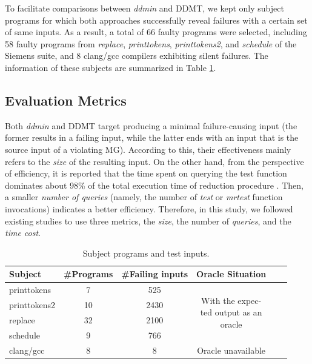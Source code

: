 To facilitate comparisons between \emph{ddmin} and DDMT, we kept only subject programs for which both approaches successfully reveal failures with a certain set of same inputs.
As a result, a total of 66 faulty programs were selected, including 58 faulty programs from \emph{replace}, \emph{printtokens}, \emph{printtokens2}, 
and \emph{schedule} of the Siemens suite, and 8 clang/gcc compilers exhibiting silent failures.
The information of these subjects are summarized in Table \ref{tab:subjects}.


\subsection{Evaluation Metrics}
Both \emph{ddmin} and DDMT target producing a minimal failure-causing input (the former results in a failing input, while the latter ends with an input that is the source input of a violating MG).
According to this, their effectiveness mainly refers to  the \emph{size} of the resulting input.
On the other hand, from the perspective of efficiency, it is reported that the time spent on querying the test function dominates about 98\% of the total execution time of reduction procedure \cite{Herfert2017}.
Then, a smaller \emph{number of queries} (namely, the number of \emph{test} or \emph{mrtest} function invocations) indicates a better efficiency.
Therefore, in this study, we followed existing studies \cite{Zeller2002, wang2021, Misherghi2016, Sun2018} to use three metrics, the \emph{size}, the number of \emph{queries}, and the \emph{time cost}.

\begin{table}[!t]
\caption{Subject programs and test inputs.}
\centering
\begin{tabular}{lccccc}
\toprule
\textbf{Subject} & \textbf{\#Programs} & \textbf{\#Failing inputs} & \multicolumn{1}{c}{\textbf{Oracle Situation}} \\
\midrule
printtokens       & 7  & 525  & \multirow{4}{*}{\parbox[t]{2cm}{With the expec-\\ted output as an \\ oracle}} \\
printtokens2      & 10 & 2430  &                       \\
replace           & 32 & 2100  &                       \\
schedule          & 9  &  766 &                       \\
\midrule
clang/gcc         & 8  & 8 & Oracle unavailable                    \\
\bottomrule
\end{tabular}
\label{tab:subjects}
\end{table}

